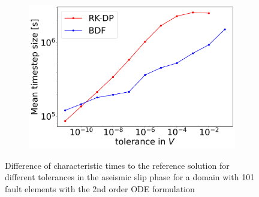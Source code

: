 \begin{figure}[H]
\begin{subfigure}[t]{0.32\textwidth}
	\end{subfigure}
	\begin{subfigure}[t]{0.32\textwidth}
		\centering
		\includegraphics[width=1\textwidth]{images/TANDEMextendedODEDifferentTolerancesSize101_AS_DT.png}
	\end{subfigure}
	\caption{Difference of characteristic times to the reference solution for different tolerances in the aseismic slip phase for a domain with 101 fault elements with the 2nd order ODE formulation}
	\label{fig:tolerancesAseismicSlip_extendedODE}
\end{figure}



